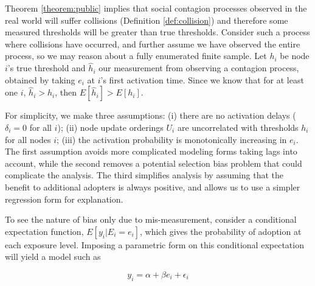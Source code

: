 \documentclass[a4paper]{article}
\begin{document}
\begin{comment}
Assume for simplicity: no activation delays, update ordering is not correlated with threshold

Then we know: E[x | y] is biased upward, since E[x | y = 1] is biased upward and E[x | y = 0] is not biased

We have 2 cases:
1) estimating a probability of adoption at each threshold
2) estimating a marginal effect, a beta coefficient, of the utility of adopting neighbors

Consider the CEF E[y | x], at each x, this will just give the probability that an individual is active in the sample

We can write beta as E^-1[x * x] E[x * y] = sum xy / sum xx

\end{comment}

Theorem \ref{theorem:public} implies that social contagion processes observed in the real world will suffer collisions (Definition \ref{def:collision}) and therefore some measured thresholds will be greater than true thresholds. Consider such a process where collisions have occurred, and further assume we have observed the entire process, so we may reason about a fully enumerated finite sample. Let $h_i$ be node $i$'s true threshold and $\hat{h}_i$ our measurement from observing a contagion process, obtained by taking $e_i$ at $i$'s first activation time. Since we know that for at least one $i$, $\hat{h}_i > h_i$, then $E[\hat{h}_i] > E[h_i]$.

For simplicity, we make three assumptions: (i) there are no activation delays ($\delta_i = 0$ for all $i$); (ii) node update orderings $U_i$ are uncorrelated with thresholds $h_i$ for all nodes $i$; (iii) the activation probability is monotonically increasing in $e_i$. The first assumption avoids more complicated modeling forms taking lags into account, while the second removes a potential selection bias problem that could complicate the analysis. The third simplifies analysis by assuming that the benefit to additional adopters is always positive, and allows us to use a simpler regression form for explanation.

To see the nature of bias only due to mis-measurement, consider a conditional expectation function, $E[y_i | E_i = e_i]$, which gives the probability of adoption at each exposure level. Imposing a parametric form on this conditional expectation will yield a model such as

\begin{equation} \label{eq:truemod}
y_i = \alpha + \beta e_i + \epsilon_i
\end{equation}
\end{document}
